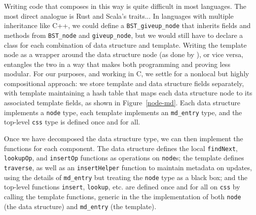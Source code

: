 \documentclass[sigplan,screen]{acmart}
\begin{document}
Writing code that composes in this way is quite difficult in most languages. The most direct analogue is Rust and Scala's traits... In languages with multiple inheritance like C++, we could define a \lstinline{BST_giveup_node} that inherits fields and methods from \lstinline{BST_node} and \lstinline{giveup_node}, but we would still have to declare a class for each combination of data structure and template. Writing the template node as a wrapper around the data structure node (as done by \citet{vst-templates}), or vice versa, entangles the two in a way that makes both programming and proving less modular. For our purposes, and working in C, we settle for a nonlocal but highly compositional approach: we store template and data structure fields separately, with template maintaining a hash table that maps each data structure node to its associated template fields, as shown in Figure~\ref{node-md}. Each data structure implements a \lstinline{node} type, each template implements an \lstinline{md_entry} type, and the top-level \lstinline{css} type is defined once and for all.

Once we have decomposed the data structure type, we can then implement the functions for each component. The data structure defines the local \lstinline{findNext}, \lstinline{lookupOp}, and \lstinline{insertOp} functions as operations on \lstinline{node}s; the template defines \lstinline{traverse}, as well as an \lstinline{insertHelper} function to maintain metadata on updates, using the details of \lstinline{md_entry} but treating the \lstinline{node} type as a black box; and the top-level functions \lstinline{insert}, \lstinline{lookup}, etc. are defined once and for all on \lstinline{css} by calling the template functions, generic in the the implementation of both \lstinline{node} (the data structure) and \lstinline{md_entry} (the template).
\end{document}
